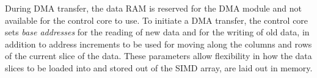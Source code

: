 During \ac{DMA} transfer, the data \ac{RAM} is reserved for the \ac{DMA} module
and not available for the control core to use. To initiate a \ac{DMA} transfer,
the control core sets \emph{base addresses} for the reading of new data and for
the writing of old data, in addition to address increments to be used for moving
along the columns and rows of the current slice of the data. These parameters
allow flexibility in how the data slices to be loaded into and stored out of the
\ac{SIMD} array, are laid out in memory.
